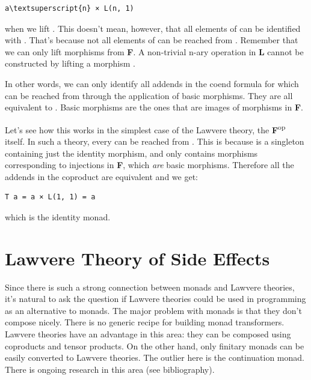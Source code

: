 \begin{Verbatim}[commandchars=\\\{\}]
a\textsuperscript{n} × L(n, 1)
\end{Verbatim}
when we lift . This doesn't
mean, however, that all elements of  can be
identified with . That's because not all elements
of  can be reached from . Remember
that we can only lift morphisms from \textbf{F}. A non-trivial n-ary
operation in \textbf{L} cannot be constructed by lifting a morphism
.

In other words, we can only identify all addends in the coend formula
for which  can be reached from 
through the application of basic morphisms. They are all equivalent to
. Basic morphisms are the ones that are images of
morphisms in \textbf{F}.

Let's see how this works in the simplest case of the Lawvere theory, the
\textbf{F}\textsuperscript{op} itself. In such a theory, every
 can be reached from . This is because
 is a singleton containing just the identity morphism,
and  only contains morphisms corresponding to
injections  in \textbf{F}, which \emph{are}
basic morphisms. Therefore all the addends in the coproduct are
equivalent and we get:

\begin{Verbatim}[commandchars=\\\{\}]
T a = a × L(1, 1) = a
\end{Verbatim}
which is the identity monad.

\section{Lawvere Theory of Side
Effects}\label{lawvere-theory-of-side-effects}

Since there is such a strong connection between monads and Lawvere
theories, it's natural to ask the question if Lawvere theories could be
used in programming as an alternative to monads. The major problem with
monads is that they don't compose nicely. There is no generic recipe for
building monad transformers. Lawvere theories have an advantage in this
area: they can be composed using coproducts and tensor products. On the
other hand, only finitary monads can be easily converted to Lawvere
theories. The outlier here is the continuation monad. There is ongoing
research in this area (see bibliography).

